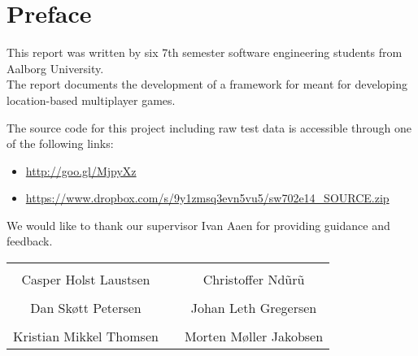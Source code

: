 \thispagestyle{empty}
\section*{Preface}
This report was written by six 7th semester software engineering students from Aalborg University.\\

\noindent The report documents the development of a framework for meant for developing location-based multiplayer games.

\noindent The source code for this project including raw test data is accessible through one of the following links:
\begin{itemize}
\item \url{http://goo.gl/MjpyXz}
\item \url{https://www.dropbox.com/s/9y1zmsq3evn5vu5/sw702e14_SOURCE.zip}
\end{itemize}

\vspace{.2cm}
\noindent We would like to thank our supervisor Ivan Aaen for providing guidance and feedback.

\begin{table}[H]
	\centering
	\vspace{2cm}
		\begin{tabular}{c c c}
			\underline{\phantom{JAERJAERJAERJAERGO}} & \phantom{cookies} & \underline{\phantom{JAERJAERJAERJAERGO}} \\
			Casper Holst Laustsen & \phantom{cookies} & Christoffer Ndũrũ\\[1.5cm]
		    \underline{\phantom{JAERJAERJAERJAERGO}} & \phantom{cookies} & \underline{\phantom{JAERJAERJAERJAERGO}} \\
			Dan Skøtt Petersen & \phantom{cookies} & Johan Leth Gregersen\\[1.5cm]
			\underline{\phantom{JAERJAERJAERJAERGO}} & \phantom{cookies} & \underline{\phantom{JAERJAERJAERJAERGO}} \\ 
			Kristian Mikkel Thomsen & \phantom{cookies} & Morten Møller Jakobsen\\[.5cm]				
		\end{tabular}
\end{table}
